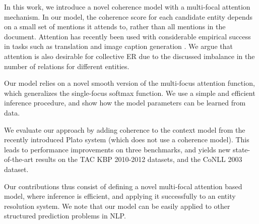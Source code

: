 In this work, we introduce a novel coherence model with a multi-focal attention mechanism. In our model, the coherence score for each candidate entity depends on a small set of mentions it attends to, rather than all mentions in the document. Attention has recently been used with considerable empirical success in tasks such as translation \cite{bahdanau2014neural} and image caption generation \cite{xu2015show}. We argue that attention is also desirable for collective ER due to the discussed imbalance in the number of relations for different entities.

Our model relies on a novel smooth version of the multi-focus attention function, which generalizes the single-focus softmax function. We use a simple and efficient inference procedure, and show how the model parameters can be learned from data.

We evaluate our approach by adding coherence to the context model from the recently introduced Plato system \cite{Lazic2015} (which does not use a coherence model). This leads to performance improvements on three benchmarks, and yields new state-of-the-art results on the TAC KBP 2010-2012 datasets, and the CoNLL 2003 dataset.

Our contributions thus consist of defining a novel multi-focal attention based model, where inference is efficient, and applying it successfully to an entity resolution system. We note that our model can be easily applied to other structured prediction problems in NLP.

